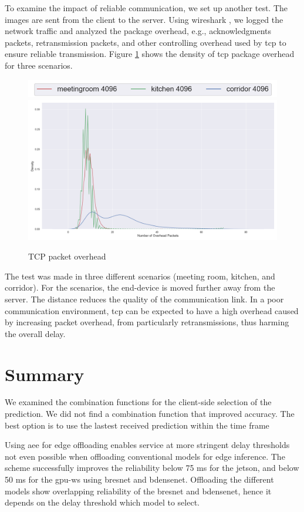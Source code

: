 To examine the impact of reliable communication, we set up another test. The images are sent from the client to the server. Using \gls{wireshark} \cite{noauthor_wireshark_nodate}, we logged the network traffic and analyzed the package overhead, e.g., acknowledgments packets, retransmission packets, and other controlling overhead used by \gls{tcp} to ensure reliable transmission. Figure \ref{fig:tcp-overhead} shows the density of \gls{tcp} package overhead for three scenarios. 
\begin{figure}
	\centering
	\includegraphics[width=.5\linewidth]{figures/tcp/density_legend}
	\includegraphics[width=.7\linewidth]{figures/tcp/density}
	\caption[TCP retransmission overhead]{TCP packet overhead}
	\label{fig:tcp-overhead}
\end{figure}
The test was made in three different scenarios (meeting room, kitchen, and corridor). For the scenarios, the end-device is moved further away from the server. The distance reduces the quality of the communication link. In a poor communication environment, \gls{tcp} can be expected to have a high overhead caused by increasing packet overhead, from particularly retransmissions, thus harming the overall delay.  

\section{Summary} \label{sec:edge-summary}

We examined the combination functions for the client-side selection of the prediction.  We did not find a combination function that improved accuracy.  The best option is to use the lastest received prediction within the time frame

Using \gls{aee} for edge offloading enables service at more stringent delay thresholds not even possible when offloading conventional models for edge inference. The scheme successfully improves the reliability below 75 ms for the \gls{jetson}, and below 50 ms for the \gls{gpu-ws} using \gls{bresnet} and \gls{bdensenet}. Offloading the different models show overlapping reliability of the \gls{bresnet} and \gls{bdensenet}, hence it depends on the delay threshold which model to select.

